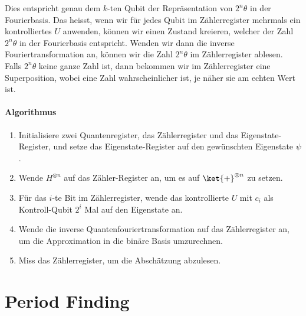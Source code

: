 Dies entspricht genau dem $k$-ten Qubit der Repräsentation von $2^n\theta$ in der Fourierbasis. Das heisst, wenn wir für jedes Qubit im Zählerregister mehrmals ein kontrolliertes $U$ anwenden, können wir einen Zustand kreieren, welcher der Zahl $2^n\theta$ in der Fourierbasis entspricht. Wenden wir dann die inverse Fouriertransformation an, können wir die Zahl $2^n\theta$ im Zählerregister ablesen. Falls $2^n\theta$ keine ganze Zahl ist, dann bekommen wir im Zählerregister eine Superposition, wobei eine Zahl wahrscheinlicher ist, je näher sie am echten Wert ist.

\paragraph{Algorithmus}
\begin{enumerate}
    \item Initialisiere zwei Quantenregister, das Zählerregister und das Eigenstate-Register, und setze das Eigenstate-Register auf den gewünschten Eigenstate $\psi$.
    \item Wende $H^{\otimes n}$ auf das Zähler-Register an, um es auf $\ket{+}^{\otimes n}$ zu setzen.
    \item Für das $i$-te Bit im Zählerregister, wende das kontrollierte $U$ mit $c_i$ als Kontroll-Qubit $2^i$ Mal auf den Eigenstate an.
    \item Wende die inverse Quantenfouriertransformation auf das Zählerregister an, um die Approximation in die binäre Basis umzurechnen.
    \item Miss das Zählerregister, um die Abschätzung abzulesen.
\end{enumerate}
 \newline

\section{Period Finding}
